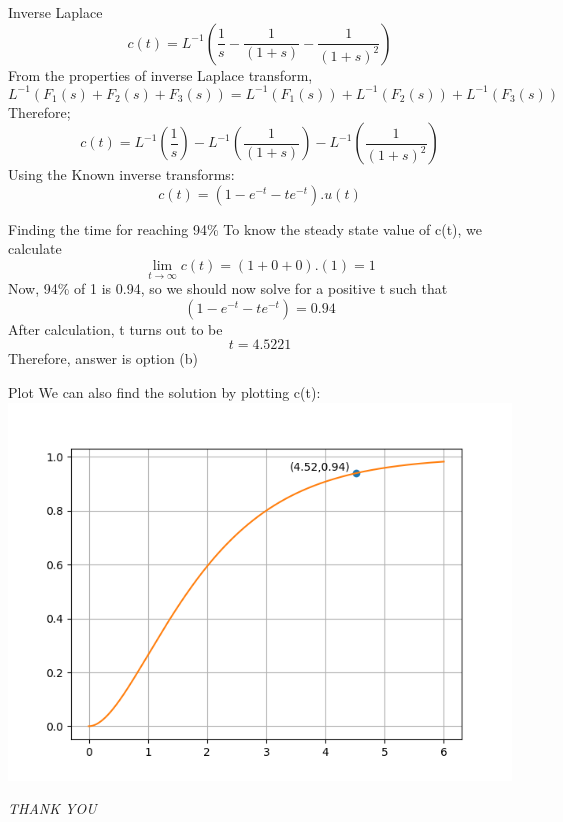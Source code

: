 \documentclass{beamer}
\begin{document}
\begin{frame}{Inverse Laplace}
$$c(t) = L^{-1} ( \frac{1}{s} - \frac{1}{(1+s)} - \frac{1}{(1+s)^2}) $$
From the properties of inverse Laplace transform,
$$L^{-1} (F_1(s) + F_2(s) + F_3(s)) = L^{-1}(F_1(s)) + L^{-1}(F_2(s)) + L^{-1}(F_3(s))$$
Therefore;
$$c(t) = L^{-1} ( \frac{1}{s}) - L^{-1}(\frac{1}{(1+s)}) - L^{-1}(\frac{1}{(1+s)^2}) $$
Using the Known inverse transforms:
$$c(t) = (1 - e^{-t} - te^{-t}) . u(t)$$


\end{frame}
\begin{frame}{Finding the time for reaching 94\%}
To know the steady state value of c(t), we calculate 
$$\lim_{t\to\infty} c(t) = (1+0+0).(1) = 1$$
Now, 94\% of 1 is 0.94, so we should now solve for a positive t such that
$$(1 - e^{-t} - te^{-t}) = 0.94$$
After calculation, t turns out to be
$$ t = 4.5221$$
Therefore, answer is option (b)
\end{frame}
\begin{frame}{Plot}
We can also find the solution by plotting c(t):
\includegraphics[scale=0.65]{plot.png}
\end{frame}    
\begin{frame}{}
  \centering \Large
  \emph{THANK YOU}
\end{frame}
\end{document}
